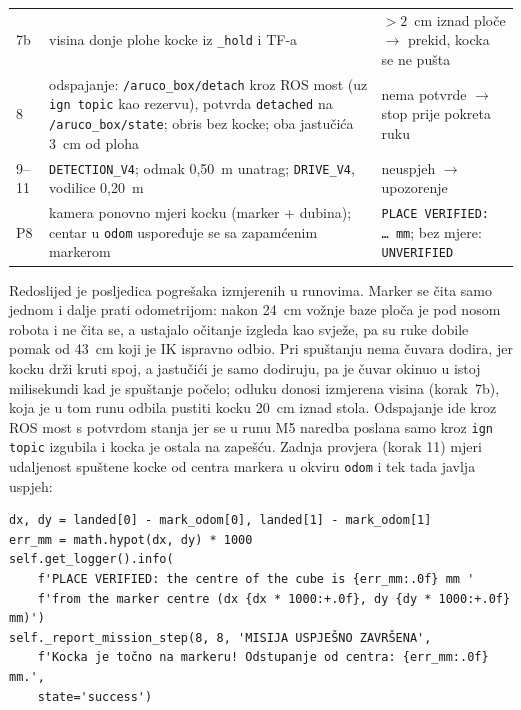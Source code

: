 \begin{small}
\begin{longtable}{@{}>{\raggedright\arraybackslash}p{}>{\raggedright\arraybackslash}p{}>{\raggedright\arraybackslash}p{}@{}}
\footnotesize 7b & \footnotesize visina donje plohe kocke iz \texttt{\_hold} i TF-a & \footnotesize $>2$~cm iznad ploče $\rightarrow$ prekid, kocka se ne pušta \\
\footnotesize 8 & \footnotesize odspajanje: \texttt{/aruco\_box/detach} kroz ROS most (uz \texttt{ign topic} kao rezervu), potvrda \texttt{detached} na \texttt{/aruco\_box/state}; obris bez kocke; oba jastučića 3~cm od ploha & \footnotesize nema potvrde $\rightarrow$ stop prije pokreta ruku \\
\footnotesize 9--11 & \footnotesize \texttt{DETECTION\_V4}; odmak 0{,}50~m unatrag; \texttt{DRIVE\_V4}, vodilice 0{,}20~m & \footnotesize neuspjeh $\rightarrow$ upozorenje \\
\footnotesize P8 & \footnotesize kamera ponovno mjeri kocku (marker + dubina); centar u \texttt{odom} uspoređuje se sa zapamćenim markerom & \footnotesize \texttt{PLACE VERIFIED: \ldots\ mm}; bez mjere: \texttt{UNVERIFIED} \\
\bottomrule
\end{longtable}
\end{small}

Redoslijed je posljedica pogrešaka izmjerenih u runovima. Marker se čita samo jednom i dalje prati
odometrijom: nakon 24~cm vožnje baze ploča je pod nosom robota i ne čita se, a ustajalo očitanje izgleda
kao svježe, pa su ruke dobile pomak od 43~cm koji je IK ispravno odbio. Pri spuštanju nema čuvara dodira,
jer kocku drži kruti spoj, a jastučići je samo dodiruju, pa je čuvar okinuo u istoj milisekundi kad je
spuštanje počelo; odluku donosi izmjerena visina (korak~7b), koja je u tom runu odbila pustiti kocku
20~cm iznad stola. Odspajanje ide kroz ROS most s potvrdom stanja jer se u runu M5 naredba poslana samo
kroz \texttt{ign topic} izgubila i kocka je ostala na zapešću. Zadnja provjera (korak 11) mjeri
udaljenost spuštene kocke od centra markera u okviru \texttt{odom} i tek tada javlja uspjeh:

\begin{lstlisting}[style=code-python, caption={Zadnja provjera odlaganja (\texttt{main\_task.py}, redci 2825--2837): udaljenost od markera prije poruke \texttt{MISIJA USPJEŠNO ZAVRŠENA}}, label={lst:place-verified}]
dx, dy = landed[0] - mark_odom[0], landed[1] - mark_odom[1]
err_mm = math.hypot(dx, dy) * 1000
self.get_logger().info(
    f'PLACE VERIFIED: the centre of the cube is {err_mm:.0f} mm '
    f'from the marker centre (dx {dx * 1000:+.0f}, dy {dy * 1000:+.0f} mm)')
self._report_mission_step(8, 8, 'MISIJA USPJEŠNO ZAVRŠENA',
    f'Kocka je točno na markeru! Odstupanje od centra: {err_mm:.0f} mm.',
    state='success')
\end{lstlisting}

